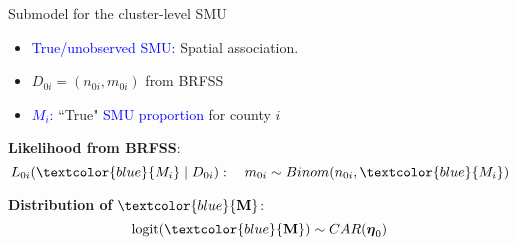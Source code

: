 \documentclass{beamer}
\begin{document}
\begin{frame}{Submodel for the cluster-level SMU}
\protect\hypertarget{estimation-error-in-cluster-level-covariate-smu}{}
\begin{itemize}
\vfill \item
\textcolor{blue}{True/unobserved SMU:} Spatial association. 
\end{itemize}

\begin{itemize}
 \vfill \item $D_{0i}=(n_{0i},m_{0i})$ from BRFSS
    
    \vfill \item \textcolor{blue}{\( M_i\):} ``True" \textcolor{blue}{SMU proportion} for county \(i\)
\end{itemize}


\textbf{Likelihood from BRFSS}: \[ L_{0i}(\textcolor{blue}{M_i}\mid D_{0i}): \quad m_{0i} \sim Binom(n_{0i},\textcolor{blue}{M_i})\]

\textbf{Distribution of} $\textcolor{blue}{\mathbf{M}}$: \[\text{logit}(\textcolor{blue}{\mathbf{M}})\sim
CAR(\boldsymbol{\eta}_0)
\]
\end{frame}




    
\end{document}
